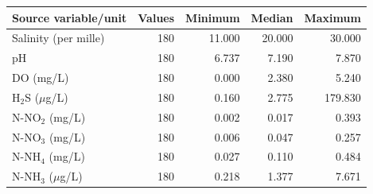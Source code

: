 \begin{tabular}{lrrrr}
\toprule
Source variable/unit & Values & Minimum & Median & Maximum \\
\midrule
Salinity (per mille) & 180 & 11.000 & 20.000 & 30.000 \\
pH & 180 & 6.737 & 7.190 & 7.870 \\
DO (mg/L) & 180 & 0.000 & 2.380 & 5.240 \\
H$_2$S ($\mu$g/L) & 180 & 0.160 & 2.775 & 179.830 \\
N-NO$_2$ (mg/L) & 180 & 0.002 & 0.017 & 0.393 \\
N-NO$_3$ (mg/L) & 180 & 0.006 & 0.047 & 0.257 \\
N-NH$_4$ (mg/L) & 180 & 0.027 & 0.110 & 0.484 \\
N-NH$_3$ ($\mu$g/L) & 180 & 0.218 & 1.377 & 7.671 \\
\bottomrule
\end{tabular}